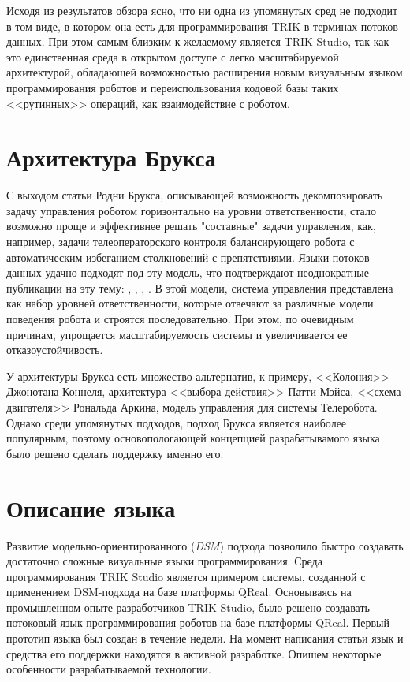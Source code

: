 \documentclass[conference]{IEEEtran}
\begin{document}
Исходя из результатов обзора ясно, что ни одна из упомянутых сред не подходит в том виде, в котором она есть для программирования TRIK в терминах потоков данных. При этом самым близким к желаемому является TRIK Studio, так как это единственная среда в открытом доступе с легко масштабируемой архитектурой, обладающей возможностью расширения новым визуальным языком программирования роботов и переиспользования кодовой базы таких <<рутинных>> операций, как взаимодействие с роботом.


\section{Архитектура Брукса}
С выходом статьи Родни Брукса\cite{1_brooks_1986}, описывающей возможность декомпозировать задачу управления роботом горизонтально на уровни ответственности, стало возможно проще и эффективнее решать "составные" задачи управления, как, например, задачи телеоператорского контроля балансирующего робота с автоматическим избеганием столкновений с препятствиями. Языки потоков данных удачно подходят под эту модель, что подтверждают неоднократные публикации на эту тему: \cite{simpson2006mobile}, \cite{banyasad2000visual}, \cite{posso2011process}, \cite{proetzsch2007behaviour}. В этой модели, система управления представлена как набор уровней ответственности, которые отвечают за различные модели поведения робота и строятся последовательно. При этом, по очевидным причинам, упрощается масштабируемость системы и увеличивается ее отказоустойчивость.

	У архитектуры Брукса есть множество альтернатив, к примеру, <<Колония>> Джонотана Коннеля, архитектура <<выбора-действия>> Патти Мэйса, <<схема двигателя>> Рональда Аркина\cite{simpson2009toward}, модель управления для системы Телеробота\cite{albus1989nasa}. Однако среди упомянутых подходов, подход Брукса является наиболее популярным, поэтому основопологающей концепцией разрабатывамого языка было решено сделать поддержку именно его.


\section{Описание языка}
Развитие модельно-ориентированного (\textit{DSM}) подхода\cite{koznov2008} позволило быстро создавать достаточно сложные визуальные языки программирования. Среда программирования TRIK Studio является примером системы, созданной с применением DSM-подхода на базе платформы QReal\cite{qrealMeta}\cite{kuzenkova2013qreal}. Основываясь на промышленном опыте разработчиков TRIK Studio, было решено создавать потоковый язык программирования роботов на базе платформы QReal. Первый прототип языка был создан в течение недели. На момент написания статьи язык и средства его поддержки находятся в активной разработке. Опишем некоторые особенности разрабатываемой технологии.
\end{document}
